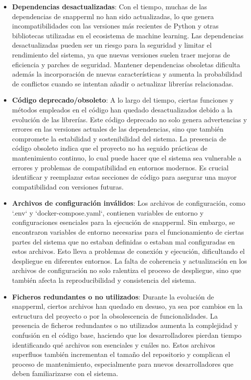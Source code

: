 \begin{itemize}
    \item \textbf{Dependencias desactualizadas}: Con el tiempo, muchas de las dependencias de \Gls{snapperml} no han sido actualizadas, lo que genera incompatibilidades con las versiones más recientes de Python y otras bibliotecas utilizadas en el ecosistema de machine learning. Las dependencias desactualizadas pueden ser un riesgo para la seguridad y limitar el rendimiento del sistema, ya que nuevas versiones suelen traer mejoras de eficiencia y parches de seguridad. Mantener dependencias obsoletas dificulta además la incorporación de nuevas características y aumenta la probabilidad de conflictos cuando se intentan añadir o actualizar librerías relacionadas.
    \item \textbf{Código deprecado/obsoleto}: A lo largo del tiempo, ciertas funciones y métodos empleados en el código han quedado desactualizados debido a la evolución de las librerías. Este código deprecado no solo genera advertencias y errores en las versiones actuales de las dependencias, sino que también compromete la estabilidad y sostenibilidad del sistema. La presencia de código obsoleto indica que el proyecto no ha seguido prácticas de mantenimiento continuo, lo cual puede hacer que el sistema sea vulnerable a errores y problemas de compatibilidad en entornos modernos. Es crucial identificar y reemplazar estas secciones de código para asegurar una mayor compatibilidad con versiones futuras.

    \item \textbf{Archivos de configuración inválidos}: Los archivos de configuración, como `.env` y `docker-compose.yaml`, contienen variables de entorno y configuraciones esenciales para la ejecución de \Gls{snapperml}. Sin embargo, se encontraron variables de entorno necesarias para el funcionamiento de ciertas partes del sistema que no estaban definidas o estaban mal configuradas en estos archivos. Esto lleva a problemas de conexión y ejecución, dificultando el despliegue en diferentes entornos. La falta de coherencia y actualización en los archivos de configuración no solo ralentiza el proceso de despliegue, sino que también afecta la reproducibilidad y consistencia del sistema.

    \item \textbf{Ficheros redundantes o no utilizados}: Durante la evolución de \Gls{snapperml}, ciertos archivos han quedado en desuso, ya sea por cambios en la estructura del proyecto o por la obsolescencia de funcionalidades. La presencia de ficheros redundantes o no utilizados aumenta la complejidad y confusión en el código base, haciendo que los desarrolladores pierdan tiempo identificando qué archivos son esenciales y cuáles no. Estos archivos superfluos también incrementan el tamaño del repositorio y complican el proceso de mantenimiento, especialmente para nuevos desarrolladores que deben familiarizarse con el sistema.


\end{itemize}
